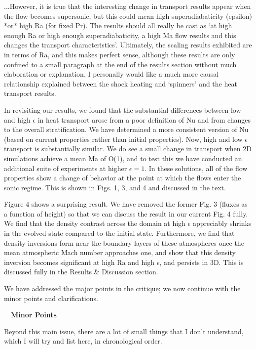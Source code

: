 \documentclass[aps, 11pt, singlecolumn]{revtex4-1} %
\begin{document}
\begin{singlespace}
\begin{myquotation}
...However, it is true that the
interesting change in transport results appear when the flow becomes
supersonic, but this could mean high superadiabaticity (epsilon) *or*
high Ra (for fixed Pr). The results should all really be cast as
`at high enough Ra or high enough superadiabaticity, a high Ma flow
results and this changes the transport characteristics'.
Ultimately, the scaling results exhibited are in terms of Ra, and this
makes perfect sense, although these results are only confined to a
small paragraph at the end of the results section without much
elaboration or explanation. I personally would like a much more causal
relationship explained between the shock heating and `spinners'
and the heat transport results.
\end{myquotation}
In revisiting our results, we found that the substantial differences between
low and high $\epsilon$ in heat transport arose from a poor definition of
Nu and from changes to the overall stratification.  We have determined a
more consistent version of Nu (based on current properties rather than initial
properties).  Now, high and low $\epsilon$ transport is substantially similar.
We do see a small change in transport when 2D simulations achieve a mean
Ma of O(1), and to test this we have conducted an additional suite of
experiments at higher $\epsilon = 1$.  In these solutions, all of the flow
properties show a change of behavior at the point at which the flows enter the
sonic regime.  This is shown in Figs. 1, 3, and 4 and discussed in the text.

Figure 4 shows a surprising result.  We have removed the former Fig. 3 (fluxes
as a function of height) so that we can discuss the result in our current
Fig. 4 fully.  We find that the density contrast across the domain at high $\epsilon$
appreciably shrinks in the evolved state compared to the initial state.  Furthermore, we find
that density inversions form near the boundary layers of these atmospheres once the mean atmospheric Mach number approaches
one, and show that this density inversion becomes significant at high Ra and high $\epsilon$,
and persists in 3D.  This is discussed fully in the Results \& Discussion section.

We have addressed the major points in the critique; we now continue with the
minor points and clarifications.

$\,$
\newline
$\,$
\newline
\indent
\large{\textbf{Minor Points}}\newline
\begin{myquotation}
Beyond this main issue, there are a lot of small things that I don't
understand, which I will try and list here, in chronological order.


\end{myquotation}
\end{singlespace}
\end{document}

